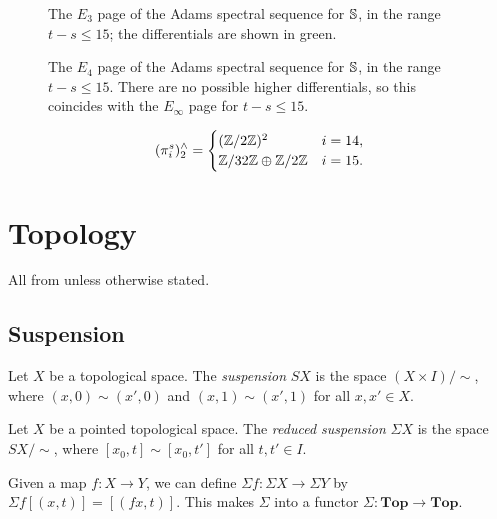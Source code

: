 \documentclass{MetricNotes2023}
\def\bb{\ensuremath\mathbb}
\def\inte{\ensuremath\mathbb{Z}}
\begin{document}
\begin{figure}
\centering

\caption{The \(E_3\) page of the Adams spectral sequence for \(\bb{S}\), in the range \(t-s\leq 15\); the differentials are shown in green.}
\end{figure}

\begin{figure}
\centering

\caption{The \(E_4\) page of the Adams spectral sequence for \(\bb{S}\), in the range \(t-s\leq 15\). There are no possible higher differentials, so this coincides with the \(E_\infty\) page for \(t-s\leq 15\).}
\end{figure}

\begin{theorem}
\[(\pi_i^s)^\wedge_2=\begin{cases}
(\inte/2\inte)^2 & i = 14,\\
\inte/32\inte \oplus \inte/2\inte & i = 15.
\end{cases}\]
\end{theorem}

\clearpage

\appendix 

\section{Topology}

All from \autocite{hatcher} unless otherwise stated.

\subsection{Suspension}

\begin{definition}
Let \(X\) be a topological space. The \textit{suspension} \(SX\) is the space \newline\((X\times I)/\sim\), where \((x, 0)\sim (x', 0)\) and \((x,1)\sim (x',1)\) for all \(x,x'\in X\). 
\end{definition}

\begin{definition}
Let \(X\) be a pointed topological space. The \textit{reduced suspension} \(\Sigma X\) is the space \(SX/\sim\), where \([x_0, t]\sim [x_0, t']\) for all \(t,t'\in I\). 
\end{definition}

Given a map \(f : X \to Y\), we can define \(\Sigma f : \Sigma X \to \Sigma Y\) by \(\Sigma f[(x, t)]=[(fx, t)]\). This makes \(\Sigma \) into a functor \(\Sigma : \textbf{Top}\to \textbf{Top}\). 
\end{document}
